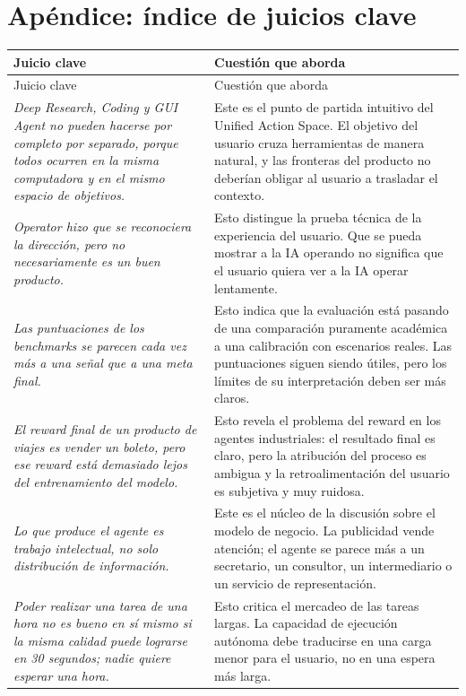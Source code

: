 \section*{Apéndice: índice de juicios clave}

\begin{longtable}{>{\raggedright\arraybackslash}p{} >{\raggedright\arraybackslash}p{}}
\toprule
Juicio clave & Cuestión que aborda \\
\midrule
\endfirsthead
\toprule
Juicio clave & Cuestión que aborda \\
\midrule
\endhead
\textit{Deep Research, Coding y GUI Agent no pueden hacerse por completo por separado, porque todos ocurren en la misma computadora y en el mismo espacio de objetivos.} & Este es el punto de partida intuitivo del Unified Action Space. El objetivo del usuario cruza herramientas de manera natural, y las fronteras del producto no deberían obligar al usuario a trasladar el contexto. \\
\textit{Operator hizo que se reconociera la dirección, pero no necesariamente es un buen producto.} & Esto distingue la prueba técnica de la experiencia del usuario. Que se pueda mostrar a la IA operando no significa que el usuario quiera ver a la IA operar lentamente. \\
\textit{Las puntuaciones de los benchmarks se parecen cada vez más a una señal que a una meta final.} & Esto indica que la evaluación está pasando de una comparación puramente académica a una calibración con escenarios reales. Las puntuaciones siguen siendo útiles, pero los límites de su interpretación deben ser más claros. \\
\textit{El reward final de un producto de viajes es vender un boleto, pero ese reward está demasiado lejos del entrenamiento del modelo.} & Esto revela el problema del reward en los agentes industriales: el resultado final es claro, pero la atribución del proceso es ambigua y la retroalimentación del usuario es subjetiva y muy ruidosa. \\
\textit{Lo que produce el agente es trabajo intelectual, no solo distribución de información.} & Este es el núcleo de la discusión sobre el modelo de negocio. La publicidad vende atención; el agente se parece más a un secretario, un consultor, un intermediario o un servicio de representación. \\
\textit{Poder realizar una tarea de una hora no es bueno en sí mismo si la misma calidad puede lograrse en 30 segundos; nadie quiere esperar una hora.} & Esto critica el mercadeo de las tareas largas. La capacidad de ejecución autónoma debe traducirse en una carga menor para el usuario, no en una espera más larga. \\

\end{longtable}
